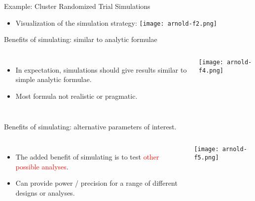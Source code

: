 \documentclass[ignorenonframetext,]{beamer}
\providecommand{\tightlist}{%
  \setlength{\itemsep}{0pt}\setlength{\parskip}{0pt}}
\begin{document}
\begin{frame}{Example: Cluster Randomized Trial Simulations}
\protect\hypertarget{example-cluster-randomized-trial-simulations}{}

\begin{itemize}
\tightlist
\item
  Visualization of the simulation strategy:
  \texttt{[image: arnold-f2.png]}
\end{itemize}

\end{frame}

\begin{frame}{Benefits of simulating: similar to analytic formulae}
\protect\hypertarget{benefits-of-simulating-similar-to-analytic-formulae}{}

\begin{columns}
  \begin{itemize}
    \item In expectation, simulations should give results similar to simple analytic formulae.
    \smallskip{}
    \item Most formula not realistic or pragmatic.
  \end{itemize}
  
  \texttt{[image: arnold-f4.png]}
  
\end{columns}

\end{frame}

\begin{frame}{Benefits of simulating: alternative parameters of
interest.}
\protect\hypertarget{benefits-of-simulating-alternative-parameters-of-interest.}{}

\begin{columns}
  \begin{itemize}
    \item The added benefit of simulating is to test \textcolor{red}{other possible analyses}.
    \smallskip{}
    \item Can provide power / precision for a range of different designs or analyses.
  \end{itemize}
  
  \texttt{[image: arnold-f5.png]}
  
\end{columns}

\end{frame}
\end{document}
